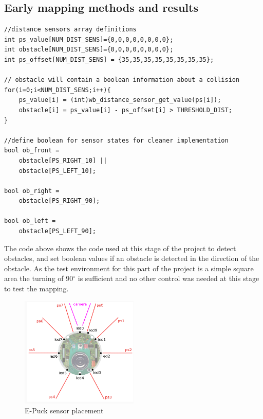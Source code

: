 \begin{flushleft}
\subsection{Early mapping methods and results}

\begin{lstlisting}[caption={Proximity sensor reading}]
//distance sensors array definitions
int ps_value[NUM_DIST_SENS]={0,0,0,0,0,0,0,0};
int obstacle[NUM_DIST_SENS]={0,0,0,0,0,0,0,0};
int ps_offset[NUM_DIST_SENS] = {35,35,35,35,35,35,35,35};

// obstacle will contain a boolean information about a collision
for(i=0;i<NUM_DIST_SENS;i++){
	ps_value[i] = (int)wb_distance_sensor_get_value(ps[i]);
	obstacle[i] = ps_value[i] - ps_offset[i] > THRESHOLD_DIST;
}

//define boolean for sensor states for cleaner implementation
bool ob_front =
	obstacle[PS_RIGHT_10] ||
	obstacle[PS_LEFT_10];

bool ob_right =
	obstacle[PS_RIGHT_90];

bool ob_left =
	obstacle[PS_LEFT_90];
\end{lstlisting}

The code above shows the code used at this stage of the project to detect obstacles, and set boolean values if an obstacle is detected in the direction of the  obstacle. As the test environment for this part of the project is a simple square area the turning of 90$^{\circ}$ is sufficient and no other control was needed at this stage to test the mapping. 

\begin{figure}[h]
\centering
\includegraphics[width = 0.5\textwidth]{../../figures/e_puck_sensor_placement.png} 
\caption[E-Puck sensor placement]{E-Puck sensor placement\footnotemark}
\label{sensor_placement}
\end{figure}


\end{flushleft}
